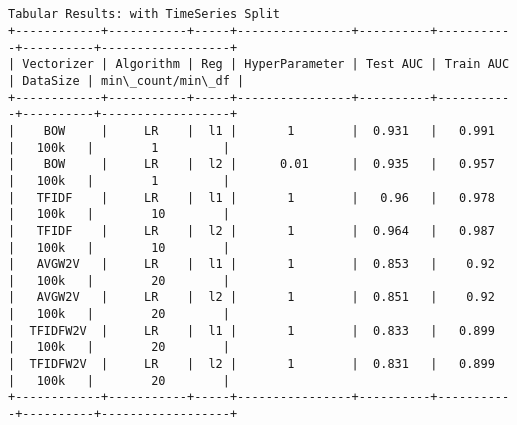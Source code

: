 \documentclass[11pt]{article}
\begin{document}
    \begin{Verbatim}[commandchars=\\\{\}]


Tabular Results: with TimeSeries Split
+------------+-----------+-----+----------------+----------+-----------+----------+------------------+
| Vectorizer | Algorithm | Reg | HyperParameter | Test AUC | Train AUC | DataSize | min\_count/min\_df |
+------------+-----------+-----+----------------+----------+-----------+----------+------------------+
|    BOW     |     LR    |  l1 |       1        |  0.931   |   0.991   |   100k   |        1         |
|    BOW     |     LR    |  l2 |      0.01      |  0.935   |   0.957   |   100k   |        1         |
|   TFIDF    |     LR    |  l1 |       1        |   0.96   |   0.978   |   100k   |        10        |
|   TFIDF    |     LR    |  l2 |       1        |  0.964   |   0.987   |   100k   |        10        |
|   AVGW2V   |     LR    |  l1 |       1        |  0.853   |    0.92   |   100k   |        20        |
|   AVGW2V   |     LR    |  l2 |       1        |  0.851   |    0.92   |   100k   |        20        |
|  TFIDFW2V  |     LR    |  l1 |       1        |  0.833   |   0.899   |   100k   |        20        |
|  TFIDFW2V  |     LR    |  l2 |       1        |  0.831   |   0.899   |   100k   |        20        |
+------------+-----------+-----+----------------+----------+-----------+----------+------------------+

    \end{Verbatim}
\end{document}
